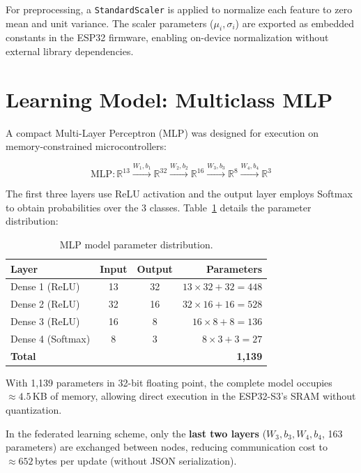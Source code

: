 For preprocessing, a \texttt{StandardScaler} is applied to normalize each feature to zero mean and unit variance. The scaler parameters ($\mu_i, \sigma_i$) are exported as embedded constants in the ESP32 firmware, enabling on-device normalization without external library dependencies.

\section{Learning Model: Multiclass MLP}
\label{sec:modelo_mlp}

A compact Multi-Layer Perceptron (MLP) was designed for execution on memory-constrained microcontrollers:

\begin{equation}
\text{MLP}: \mathbb{R}^{13} \xrightarrow{W_1, b_1} \mathbb{R}^{32} \xrightarrow{W_2, b_2} \mathbb{R}^{16} \xrightarrow{W_3, b_3} \mathbb{R}^{8} \xrightarrow{W_4, b_4} \mathbb{R}^{3}
\label{eq:mlp}
\end{equation}

The first three layers use ReLU activation and the output layer employs Softmax to obtain probabilities over the 3 classes. Table~\ref{tab:model_params} details the parameter distribution:

\begin{table}[H]
\centering
\caption{MLP model parameter distribution.}
\label{tab:model_params}
\begin{tabular}{l c c r}
\toprule
\textbf{Layer} & \textbf{Input} & \textbf{Output} & \textbf{Parameters} \\
\midrule
Dense 1 (ReLU)    & 13 & 32 & $13 \times 32 + 32 = 448$ \\
Dense 2 (ReLU)    & 32 & 16 & $32 \times 16 + 16 = 528$ \\
Dense 3 (ReLU)    & 16 &  8 & $16 \times  8 +  8 = 136$ \\
Dense 4 (Softmax) &  8 &  3 & $ 8 \times  3 +  3 =  27$ \\
\midrule
\textbf{Total}    &    &    & \textbf{1,139} \\
\bottomrule
\end{tabular}
\end{table}

With 1,139 parameters in 32-bit floating point, the complete model occupies $\approx 4.5$\,KB of memory, allowing direct execution in the ESP32-S3's SRAM without quantization.

In the federated learning scheme, only the \textbf{last two layers} ($W_3, b_3, W_4, b_4$, 163 parameters) are exchanged between nodes, reducing communication cost to $\approx 652$\,bytes per update (without JSON serialization).

